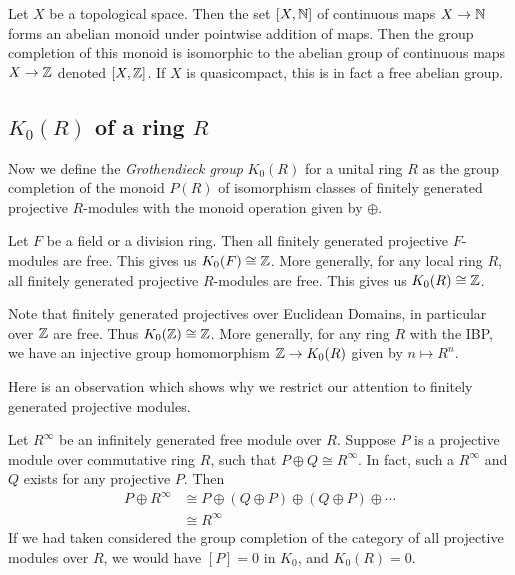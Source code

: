 \begin{example}
  Let $X$ be a topological space. Then the set $[X, \mathbb{N}]$ of continuous maps $X \to \mathbb{N}$ forms an abelian monoid
  under pointwise addition of maps. Then the group completion of this monoid is isomorphic to the abelian group of continuous maps 
  $X \to \mathbb{Z}$ denoted $[X,\mathbb{Z}]$.
  If $X$ is quasicompact, this is in fact a free abelian group.
\end{example}

\subsection{$K_0(R)$ of a ring $R$}
\begin{definition}[$K_0(R)$]
Now we define the \emph{Grothendieck group} $K_0(R)$ for a unital ring $R$ as the group completion of the monoid $P(R)$
of isomorphism classes of finitely generated projective $R$-modules with the monoid operation given by $\oplus$.
\end{definition}
\begin{example}
  Let $F$ be a field or a division ring. Then all finitely generated projective $F$-modules are free. This gives us
  $K_0(F) \cong \mathbb{Z}$. More generally, for any local ring $R$, all finitely generated projective $R$-modules are free.
  This gives us $K_0(R) \cong \mathbb{Z}$.
\end{example}

\begin{example}
  Note that finitely generated projectives over Euclidean Domains, in particular over $\mathbb{Z}$ are free.
  Thus $K_0(\mathbb{Z}) \cong \mathbb{Z}$. More generally, for any ring $R$ with the IBP, we have an 
  injective group homomorphism $\mathbb{Z} \to K_0(R)$ given by $n \mapsto R^n$.
\end{example}

Here is an observation which shows why we restrict our attention to finitely generated projective modules.
\begin{example}
Let $R^\infty$ be an infinitely generated free module over $R$.
Suppose $P$ is a projective module over commutative ring $R$,
such that $P \oplus Q \cong R^\infty$. In fact, such a $R^\infty$ and $Q$ exists for any projective $P$.
Then 
\begin{align*}
  P \oplus R^\infty &\cong P \oplus (Q \oplus P) \oplus (Q \oplus P) \oplus \cdots \\
  &\cong R^\infty
\end{align*}
If we had taken considered the group completion of the category of all projective modules over $R$,
we would have $[P] = 0$ in $K_0$, and $K_0(R) = 0$.
\end{example}

